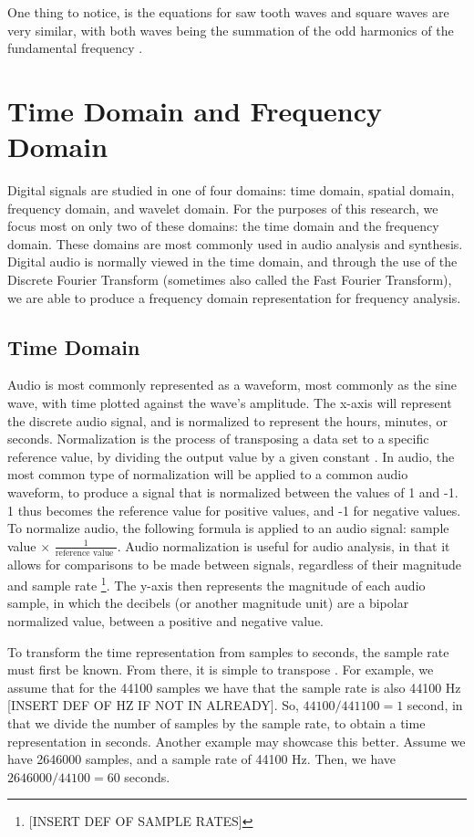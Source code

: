 One thing to notice, is the equations for saw tooth waves and square waves are very similar, with both waves being the summation of the odd harmonics of the fundamental frequency \cite{Tarr_2019}.

\section{Time Domain and Frequency Domain}

Digital signals are studied in one of four domains: time domain, spatial domain, frequency domain, and wavelet domain. For the purposes of this research, we focus most on only two of these domains: the time domain and the frequency domain. These domains are most commonly used in audio analysis and synthesis. Digital audio is normally viewed in the time domain, and through the use of the Discrete Fourier Transform (sometimes also called the Fast Fourier Transform), we are able to produce a frequency domain representation for frequency analysis.

\subsection{Time Domain}

Audio is most commonly represented as a waveform, most commonly as the sine wave, with time plotted against the wave's amplitude. The x-axis will represent the discrete audio signal, and is normalized to represent the hours, minutes, or seconds. Normalization is the process of transposing a data set to a specific reference value, by dividing the output value by a given constant \cite{Zjalic_2021}. In audio, the most common type of normalization will be applied to a common audio waveform, to produce a signal that is normalized between the values of 1 and -1. 1 thus becomes the reference value for positive values, and -1 for negative values. To normalize audio, the following formula is applied to an audio signal: sample value $\times$ $\frac{1}{\textrm{reference value }}$. Audio normalization is useful for audio analysis, in that it allows for comparisons to be made between signals, regardless of their magnitude and sample rate \footnote{[INSERT DEF OF SAMPLE RATES]}. The y-axis then represents the magnitude of each audio sample, in which the decibels (or another magnitude unit) are a bipolar normalized value, between a positive and negative value. 

To transform the time representation from samples to seconds, the sample rate must first be known. From there, it is simple to transpose \cite{Zjalic_2021}. For example, we assume that for the 44100 samples we have that the sample rate is also 44100 Hz [INSERT DEF OF HZ IF NOT IN ALREADY]. So, $44100 / 441100 = 1$ second, in that we divide the number of samples by the sample rate, to obtain a time representation in seconds. Another example may showcase this better. Assume we have 2646000 samples, and a sample rate of 44100 Hz. Then, we have $2646000/44100 = 60$ seconds.

